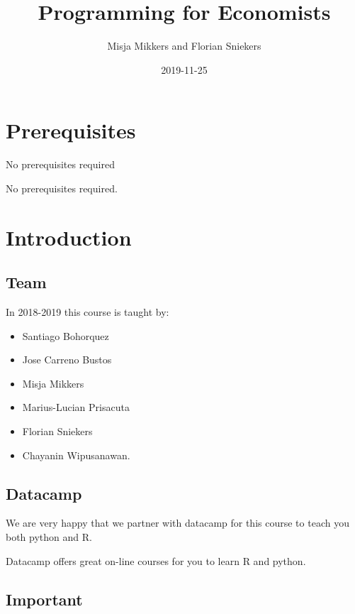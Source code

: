 \documentclass[]{book}
\title{Programming for Economists}
\author{Misja Mikkers and Florian Sniekers}
\date{2019-11-25}
\providecommand{\tightlist}{%
  \setlength{\itemsep}{0pt}\setlength{\parskip}{0pt}}
\begin{document}
\maketitle

{
\setcounter{tocdepth}{1}
\tableofcontents
}
\hypertarget{prerequisites}{%
\chapter{Prerequisites}\label{prerequisites}}

No prerequisites required

No prerequisites required.

\hypertarget{intro}{%
\chapter{Introduction}\label{intro}}

\hypertarget{team}{%
\section{Team}\label{team}}

In 2018-2019 this course is taught by:

\begin{itemize}
\tightlist
\item
  Santiago Bohorquez
\item
  Jose Carreno Bustos
\item
  Misja Mikkers
\item
  Marius-Lucian Prisacuta
\item
  Florian Sniekers
\item
  Chayanin Wipusanawan.
\end{itemize}

\hypertarget{datacamp}{%
\section{Datacamp}\label{datacamp}}

We are very happy that we partner with datacamp for this course to teach you both python and R.

Datacamp offers great on-line courses for you to learn R and python.

\hypertarget{important}{%
\section{Important}\label{important}}
\end{document}
